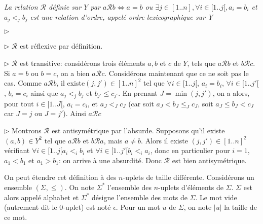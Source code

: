 \documentclass{scrartcl}
\begin{document}
			\prop \textsl{La relation $\mathcal{R}$ définie sur $Y$ par 
				$a\mathcal{R}b \Leftrightarrow a=b$ ou $\exists j \in [1..n], \forall i \in [1..j[, a_i = b_i$ et
				$a_j <_j b_j$
				est une relation d'ordre, appelé ordre lexicographique sur Y}
			\begin{labeling}{$\triangleright$}
				\item [$\triangleright$] $\mathcal{R}$ est réflexive par définition.
				\item [$\triangleright$] $\mathcal{R}$ est transitive: considérons trois éléments $a,b$ et $c$ de $Y$,
					tels que $a\mathcal{R}b$ et $b\mathcal{R}c$. Si $a=b$ ou $b=c$, on a bien $a\mathcal{R}c$.
					Considérons maintenant que ce ne soit pas le cas. Comme $a\mathcal{R}b$, il existe$(j,j')\in[1..n]^2$ tel que 
					$\forall i \in [1..j[$, $a_i = b_i$, $\forall i \in [1..j'[$, $b_i=c_i$ ainsi que $a_j <_j b_j$ et $b_{j'} \leq c_{j'}$.
					En prenant $J = \min(j,j')$, on a alors, pour tout $i \in [1..J[$, $a_i = c_i$, et $a_J <_J c_J$ 
					(car soit $a_J < b_J \leq_J c_J$, soit $a_J \leq b_J < c_J$ car $J = j$ ou $J = j'$).
					Ainsi $a\mathcal{R}c$
				\item [$\triangleright$] Montrons $\mathcal{R}$ est antisymétrique par l'absurde.
					Supposons qu'il existe $(a,b)\in Y^2$ tel que $a\mathcal{R}b$ et $b\mathcal{R}a$, mais $a\neq b$.
					Alors il existe $(j,j')\in[1..n]^2$ vérifiant $\forall i \in [1..j[ a_i <_i b_i$ et $\forall i \in [1..j'[ b_i <_i a_i$,
					donc en particulier pour $i=1$, $a_1 < b_1$ et $a_1 > b_1$: on arrive à une absurdité.
					Donc $\mathcal{R}$ est bien antisymétrique.
			\end{labeling}

			On peut étendre cet définition à des $n$-uplets de taille différente. Considérons un ensemble $(\Sigma,\leq)$.
			On note $\Sigma^*$ l'ensemble des $n$-uplets d'éléments de $\Sigma$. 
			$\Sigma$ est alors appelé alphabet et $\Sigma^*$ désigne l'ensemble des mots de $\Sigma$.
			Le mot vide (autrement dit le 0-uplet) est noté $\epsilon$.
			Pour un mot $u$ de $\Sigma$, on note $|u|$ la taille de ce mot.
\end{document}
